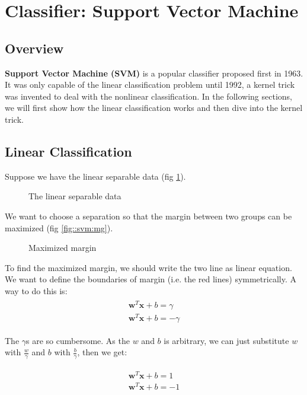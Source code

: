 \section{Classifier: Support Vector Machine}
\subsection{Overview} 
\textbf{Support Vector Machine (SVM)} is a popular classifier proposed first in 1963. 
It was only capable of the linear classification problem until 1992, a kernel trick was invented to deal with the nonlinear classification. 
In the following sections, we will first show how the linear classification works and then dive into the kernel trick.

\subsection{Linear Classification}
Suppose we have the linear separable data (fig \ref{fig:svm:lsd}). 
\begin{figure}[H]
\centering

\caption{The linear separable data}
\label{fig:svm:lsd}
\end{figure}

We want to choose a separation so that the margin between two groups can be maximized (fig \ref{fig::svm:mg}). 

\begin{figure}[H]
\centering

\caption{Maximized margin}
\label{fig:svm:mg}
\end{figure}

To find the maximized margin, we should write the two line as linear equation. 
We want to define the boundaries of margin (i.e. the red lines) symmetrically. A way to do this is:
\begin{align}
\begin{split}
\mathbf{w}^T \mathbf{x} + b = \gamma \\
\mathbf{w}^T \mathbf{x} + b = -\gamma
\end{split}
\end{align}

The $\gamma$s are so cumbersome. 
As the $w$ and $b$ is arbitrary, we can just substitute $w$ with $\frac{w}{\gamma}$ and $b$ with $\frac{b}{\gamma}$, 
then we get:

\begin{align}
\begin{split}
\mathbf{w}^T \mathbf{x} + b = 1 \\
\mathbf{w}^T \mathbf{x} + b = -1
\end{split}
\end{align}

